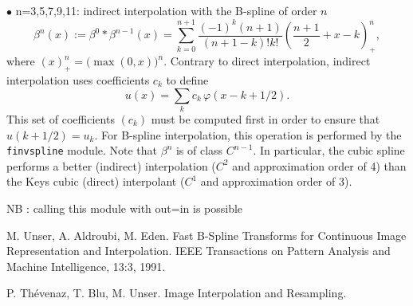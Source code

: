\smallskip

$\bullet$ n=3,5,7,9,11: indirect interpolation 
with the B-spline of order $n$
$$\beta^n(x) := \beta^0*\beta^{n-1}(x) =
\sum_{k=0}^{n+1}\frac{(-1)^k(n+1)}{(n+1-k)!k!}
\left(\frac{n+1}2+x-k\right)^n_+,$$
where $(x)^n_+ = \big(\max(0,x)\big)^n$.
Contrary to direct interpolation, 
indirect interpolation uses coefficients $c_k$ to define
$$u(x) = \sum_k c_k \,\varphi(x-k+1/2).$$
This set of coefficients $(c_k)$ must be computed first in order
to ensure that $u(k+1/2)=u_k$. For B-spline interpolation, this
operation is performed by the \verb+finvspline+ module.
Note that $\beta^n$ is of class $C^{n-1}$. In particular, the
cubic spline performs a better (indirect) interpolation ($C^2$ and
approximation order of 4) than the Keys cubic (direct) interpolant 
($C^1$ and approximation order of 3).

\medskip

NB : calling this module with out=in is possible

\begin{thebibliography}{99}
M. Unser, A. Aldroubi, M. Eden.
\newblock Fast B-Spline Transforms for Continuous Image Representation and Interpolation.
\newblock IEEE Transactions on Pattern Analysis and Machine Intelligence, 13:3, 1991.

P. Th\'evenaz, T. Blu, M. Unser.
\newblock Image Interpolation and Resampling.
\end{thebibliography}
